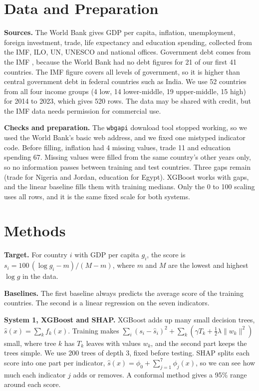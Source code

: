 \documentclass{article}
\begin{document}
\section{Data and Preparation}
\textbf{Sources.} The World Bank \citep{worldbank2026wdi} gives GDP per capita, inflation, unemployment, foreign investment, trade, life expectancy and education spending, collected from the IMF, ILO, UN, UNESCO and national offices. Government debt comes from the IMF \citep{imf2026weo}, because the World Bank had no debt figures for 21 of our first 41 countries. The IMF figure covers all levels of government, so it is higher than central government debt in federal countries such as India. We use 52 countries from all four income groups (4 low, 14 lower-middle, 19 upper-middle, 15 high) for 2014 to 2023, which gives 520 rows. The data may be shared with credit, but the IMF data needs permission for commercial use.

\textbf{Checks and preparation.} The \texttt{wbgapi} download tool stopped working, so we used the World Bank's basic web address, and we fixed one mistyped indicator code. Before filling, inflation had 4 missing values, trade 11 and education spending 67. Missing values were filled from the same country's other years only, so no information passes between training and test countries. Three gaps remain (trade for Nigeria and Jordan, education for Egypt). XGBoost works with gaps, and the linear baseline fills them with training medians. Only the 0 to 100 scaling uses all rows, and it is the same fixed scale for both systems.

\section{Methods}
\textbf{Target.} For country $i$ with GDP per capita $g_i$, the score is $s_i = 100\,(\log g_i - m)/(M - m)$, where $m$ and $M$ are the lowest and highest $\log g$ in the data.

\textbf{Baselines.} The first baseline always predicts the average score of the training countries. The second is a linear regression on the seven indicators.

\textbf{System 1, XGBoost and SHAP.} XGBoost \citep{chen2016xgboost} adds up many small decision trees, $\hat s(x)=\sum_k f_k(x)$. Training makes $\sum_i (s_i-\hat s_i)^2+\sum_k(\gamma T_k+\tfrac12\lambda\lVert w_k\rVert^2)$ small, where tree $k$ has $T_k$ leaves with values $w_k$, and the second part keeps the trees simple. We use 200 trees of depth 3, fixed before testing. SHAP \citep{lundberg2017unified,lundberg2020local} splits each score into one part per indicator, $\hat s(x)=\phi_0+\sum_{j=1}^{7}\phi_j(x)$, so we can see how much each indicator $j$ adds or removes. A conformal method \citep{vovk2005algorithmic,lei2018distribution} gives a 95\% range around each score.
\end{document}
